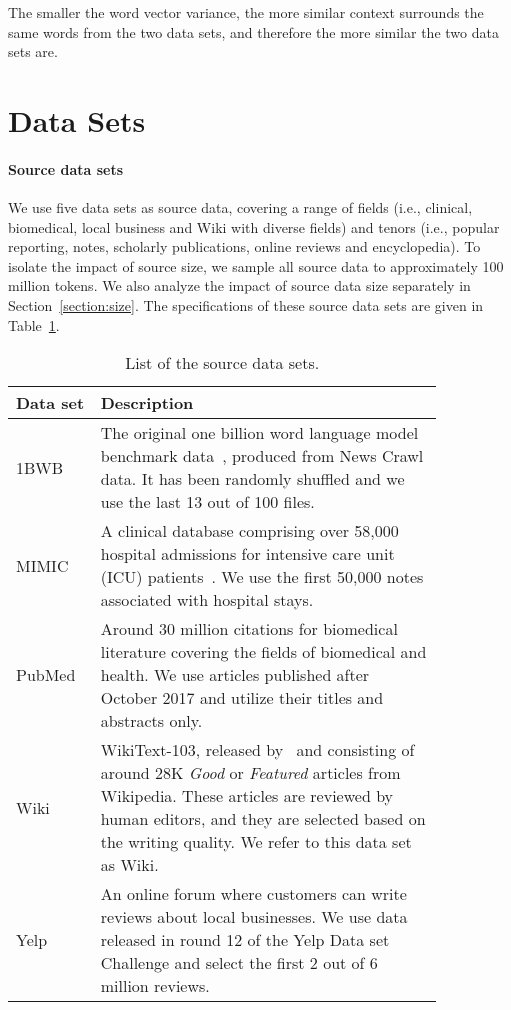 \documentclass[11pt,a4paper]{article}
\begin{document}
The smaller the word vector variance, the more similar context surrounds the same words from the two data sets, and therefore the more similar the two data sets are.

\section{Data Sets}
\paragraph{Source data sets}
We use five data sets as source data, covering a range of fields (i.e., clinical, biomedical, local business and Wiki with diverse fields) and tenors (i.e., popular reporting, notes, scholarly publications, online reviews and encyclopedia). 
To isolate the impact of source size, we sample all source data to approximately 100 million tokens. 
We also analyze the impact of source data size separately in Section~\ref{section:size}. 
The specifications of these source data sets are given in Table~\ref{tbl-sourcedata}.

\begin{table}[tb]
\begin{footnotesize}
\begin{center}
\begin{tabular}{p{0.15\linewidth}p{0.7\linewidth}}
\toprule
\bf Data set & \bf Description \\ \midrule
1BWB & The original one billion word language model benchmark data~\citep{Chelba:Mikolov:arXiv:2013}, produced from News Crawl data. It has been randomly shuffled and we use the last 13 out of 100 files. \\ \midrule
MIMIC & A clinical database comprising over 58,000 hospital admissions for intensive care unit (ICU) patients~\citep{Johnson:Pollard:SD:2016}. We use the first 50,000 notes associated with hospital stays. \\ \midrule 
PubMed & Around 30 million citations for biomedical literature covering the fields of biomedical and health. We use articles published after October 2017 and utilize their titles and abstracts only. \\ \midrule 
Wiki & WikiText-103, released by~\citet{Merity:Xiong:arXiv:2016} and consisting of around 28K \emph{Good} or \emph{Featured} articles from Wikipedia. These articles are reviewed by human editors, and they are selected based on the writing quality. We refer to this data set as Wiki. \\ \midrule Yelp & An online forum where customers can write reviews about local businesses. We use data released in round 12 of the Yelp Data set Challenge and select the first 2 out of 6 million reviews. \\ \bottomrule
\end{tabular}
\caption{\label{tbl-sourcedata}List of the source data sets.}
\end{center}
\end{footnotesize}
\end{table}
\end{document}
